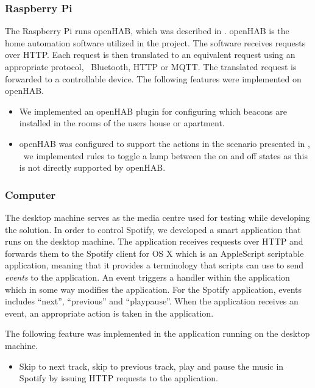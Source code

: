 \subsubsection{Raspberry Pi}

The Raspberry Pi runs openHAB, which was described in . openHAB is the home automation software utilized in the project. The software receives requests over HTTP. Each request is then translated to an equivalent request using an appropriate protocol, \eg~Bluetooth, HTTP or MQTT. The translated request is forwarded to a controllable device. The following features were implemented on openHAB.

\begin{itemize}
\item We implemented an openHAB plugin for configuring which beacons are installed in the rooms of the users house or apartment.
\item openHAB was configured to support the actions in the scenario presented in , \eg~we implemented rules to toggle a lamp between the on and off states as this is not directly supported by openHAB.
\end{itemize}

\subsubsection{Computer}

The desktop machine serves as the media centre used for testing while developing the solution. In order to control Spotify, we developed a smart application that runs on the desktop machine. The application receives requests over HTTP and forwards them to the Spotify client for OS X which is an AppleScript scriptable application, meaning that it provides a terminology that scripts can use to send \emph{events} to the application. An event triggers a handler within the application which in some way modifies the application. For the Spotify application, events includes ``next'', ``previous'' and ``playpause''. When the application receives an event, an appropriate action is taken in the application.

The following feature was implemented in the application running on the desktop machine.

\begin{itemize}
\item Skip to next track, skip to previous track, play and pause the music in Spotify by issuing HTTP requests to the application.
\end{itemize}

